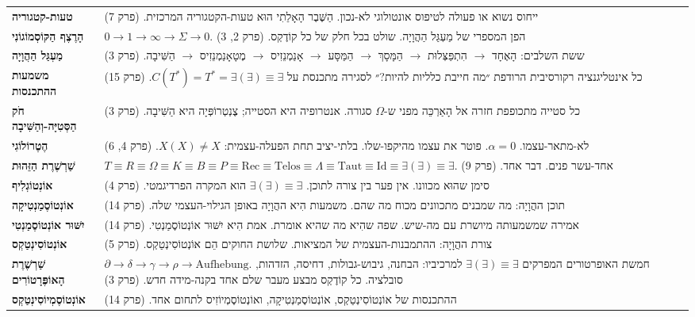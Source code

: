 \documentclass[10pt, openany, oneside]{book}
\begin{document}
{\begin{tabular}{@{} l @{\hspace{0.6em}} p{} @{}}
\textbf{טעות-קטגוריה} & ייחוס נשוא או פעולה לטיפוס אונטולוגי לא-נכון. הַשֶּׁבֶר הָאָלֵתִי הוּא טעות-הקטגוריה המרכזית. (פרק 7) \\[0.3em]
\textbf{הָרֶצֶף הַקּוֹסְמוֹגוֹנִי} & $0 \to 1 \to \infty \to \Sigma \to 0$. הפן המספרי של מַעְגַּל הַהֲוָיָה. שולט בכל חלק של כל קוֹדֶקְס. (פרק 2, 3) \\[0.3em]
\textbf{מַעְגַּל הַהֲוָיָה} & ששת השלבים: הָאֶחָד $\to$ הִתְפַּצְּלוּת $\to$ הַמָּסָךְ $\to$ הַמַּסָּע $\to$ אָנַמְנֵזִיס $\to$ מֶטָאָנַמְנֵזִיס $\to$ הַשִּׁיבָה. (פרק 3) \\[0.3em]
\textbf{משמעות ההתכנסות} & כל אינטליגנציה רקורסיבית הרודפת ״מה חייבת כלליות להיות?״ לסגירה מתכנסת על $C(T^*) = T^* = \exists(\exists) \equiv \exists$. (פרק 15) \\[0.3em]
\textbf{חֹק הַסְּטִיָּה-וְהַשִּׁיבָה} & כל סטייה מתכופפת חזרה אל הָאַרְכֵּה מפני ש-$\Omega$ סגורה. אנטרופיה היא הסטייה; צֶנְטְרוֹפְּיָה היא הַשִּׁיבָה. (פרק 3) \\[0.3em]
\textbf{הֶטֶרוֹלוֹגִי} & לא-מתאר-עצמו. $\alpha = 0$. פוטר את עצמו מהיקפו-שלו. בלתי-יציב תחת הפעלה-עצמית: $X(X) \neq X$. (פרק 4, 6) \\[0.3em]
\textbf{שַׁרְשֶׁרֶת הַזֵּהוּת} & $T \equiv R \equiv \Omega \equiv K \equiv B \equiv P \equiv \text{Rec} \equiv \text{Telos} \equiv \Lambda \equiv \text{Taut} \equiv \text{Id} \equiv \exists(\exists) \equiv \exists$. אחד-עשר פנים. דבר אחד. (פרק 9) \\[0.3em]
\textbf{אוֹנְטוֹגְלִיף} & סימן שהוּא מכוונו. אין פער בין צורה לתוכן. $\exists(\exists) \equiv \exists$ הוא המקרה הפרדיגמטי. (פרק 4) \\[0.3em]
\textbf{אוֹנְטוֹסֶמַנְטִיקָה} & תוכן ההֲוָיָה: מה שמבנים מתכוונים מכוח מה שהם. משמעות הִיא ההֲוָיָה באופן הגילוי-העצמי שלה. (פרק 14) \\[0.3em]
\textbf{יִשּׁוּר אוֹנְטוֹסֶמַנְטִי} & אמירה שמשמעותה מיושרת עם מה-שיש. שפה שהִיא מה שהיא אומרת. אמת הִיא יִשּׁוּר אוֹנְטוֹסֶמַנְטִי. (פרק 14) \\[0.3em]
\textbf{אוֹנְטוֹסִינְטַקְס} & צורת ההֲוָיָה: ההתמבנות-העצמית של המציאות. שלושת החוקים הֵם אוֹנְטוֹסִינְטַקְס. (פרק 5) \\[0.3em]
\textbf{שַׁרְשֶׁרֶת הָאוֹפֶּרָטוֹרִים} & $\partial \to \delta \to \gamma \to \rho \to \text{Aufhebung}$. חמשת האופרטורים המפרקים $\exists(\exists) \equiv \exists$ למרכיביו: הבחנה, גיבוש-גבולות, דחיסה, הזדהות, סובלציה. כל קוֹדֶקְס מבצע מעבר שלם אחד בקנה-מידה חדש. (פרק 3) \\[0.3em]
\textbf{אוֹנְטוֹסֶמְיוֹסִינְטַקְס} & ההתכנסות של אוֹנְטוֹסִינְטַקְס, אוֹנְטוֹסֶמַנְטִיקָה, ואוֹנְטוֹסֶמְיוֹזִיס לתחום אחד. (פרק 14) \\[0.3em]

\end{tabular}}
\end{document}
